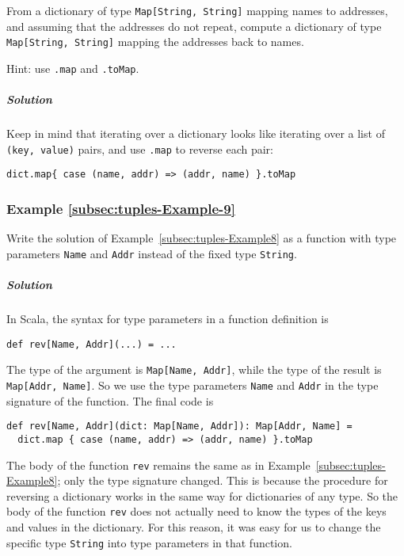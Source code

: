 From a dictionary of type \lstinline!Map[String, String]! mapping
names to addresses, and assuming that the addresses do not repeat,
compute a dictionary of type \lstinline!Map[String, String]! mapping
the addresses back to names. 

Hint: use \lstinline!.map! and \lstinline!.toMap!.

\subparagraph{Solution}

Keep in mind that iterating over a dictionary looks like iterating
over a list of \lstinline!(key, value)! pairs, and use \lstinline!.map!
to reverse each pair:

\begin{lstlisting}
dict.map{ case (name, addr) => (addr, name) }.toMap
\end{lstlisting}


\subsubsection{Example \label{subsec:tuples-Example-9}\ref{subsec:tuples-Example-9}}

Write the solution of Example~\ref{subsec:tuples-Example8} as a
function with type parameters \lstinline!Name! and \lstinline!Addr!
instead of the fixed type \lstinline!String!.

\subparagraph{Solution}

In Scala, the syntax for type parameters in a function definition
is
\begin{lstlisting}
def rev[Name, Addr](...) = ...
\end{lstlisting}
The type of the argument is \lstinline!Map[Name, Addr]!, while the
type of the result is \lstinline!Map[Addr, Name]!. So we use the
type parameters \lstinline!Name! and \lstinline!Addr! in the type
signature of the function. The final code is
\begin{lstlisting}
def rev[Name, Addr](dict: Map[Name, Addr]): Map[Addr, Name] =
  dict.map { case (name, addr) => (addr, name) }.toMap
\end{lstlisting}
The body of the function \lstinline!rev! remains the same as in Example~\ref{subsec:tuples-Example8};
only the type signature changed. This is because the procedure for
reversing a dictionary works in the same way for dictionaries of any
type. So the body of the function \lstinline!rev! does not actually
need to know the types of the keys and values in the dictionary. For
this reason, it was easy for us to change the specific type \lstinline!String!
into type parameters in that function.

